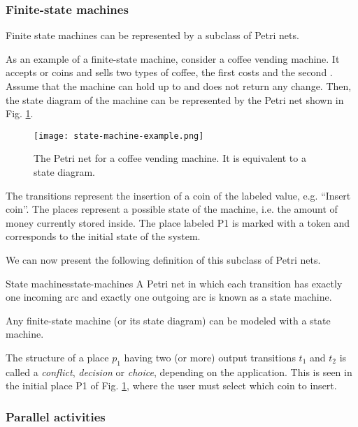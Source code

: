\subsubsection{Finite-state machines}

Finite state machines can be represented by a subclass of Petri nets.

As an example of a finite-state machine, consider a coffee vending machine.
It accepts  or  coins and sells two types of coffee, the first costs  and the second .
Assume that the machine can hold up to  and does not return any change.
Then, the state diagram of the machine can be represented
by the Petri net shown in Fig. \ref{fig:state-machine-example}.

\begin{figure}[H]
    \centering
    \texttt{[image: state-machine-example.png]}
    \caption{The Petri net for a coffee vending machine. It is equivalent to a state diagram.}
    \label{fig:state-machine-example}
\end{figure}

The transitions represent the insertion of a coin of the labeled value, e.g. ``Insert  coin''.
The places represent a possible state of the machine, i.e. the amount of money currently stored inside.
The place labeled \uppercase{P1} is marked with a token and corresponds to the initial state of the system.

We can now present the following definition of this subclass of Petri nets.

\begin{definition}{State machines}{state-machines}
    A Petri net in which each transition has exactly one incoming arc
    and exactly one outgoing arc is known as a state machine.

    Any finite-state machine (or its state diagram) can be modeled with a state machine.
\end{definition}

The structure of a place $p_1$ having two (or more) output transitions $t_1$ and $t_2$ is called
a \textit{conflict}, \textit{decision} or \textit{choice}, depending on the application.
This is seen in the initial place \uppercase{P1} of Fig. \ref{fig:state-machine-example},
where the user must select which coin to insert.

\subsubsection{Parallel activities}

